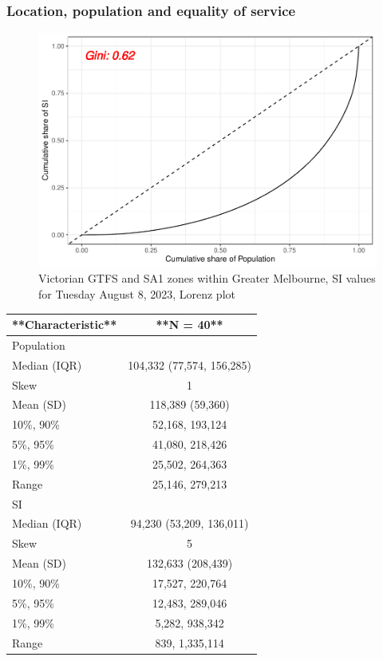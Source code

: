 \documentclass[preprint, 3p,
authoryear]{elsarticle} %
\begin{document}
\hypertarget{location-population-and-equality-of-service}{%
\subsubsection{Location, population and equality of
service}\label{location-population-and-equality-of-service}}

\begin{figure}
\centering
\includegraphics{Leveraging_GTFS_to_assess_transit_supply_Transport_Geography_files/figure-latex/Gini_coefficients-1.pdf}
\caption{Victorian GTFS and SA1 zones within Greater Melbourne, SI
values for Tuesday August 8, 2023, Lorenz plot}
\end{figure}

\begin{tabular}{l|c}
\hline
**Characteristic** & **N = 40**\\
\hline
Population & \\
\hline
Median (IQR) & 104,332 (77,574, 156,285)\\
\hline
Skew & 1\\
\hline
Mean (SD) & 118,389 (59,360)\\
\hline
10\%, 90\% & 52,168, 193,124\\
\hline
5\%, 95\% & 41,080, 218,426\\
\hline
1\%, 99\% & 25,502, 264,363\\
\hline
Range & 25,146, 279,213\\
\hline
SI & \\
\hline
Median (IQR) & 94,230 (53,209, 136,011)\\
\hline
Skew & 5\\
\hline
Mean (SD) & 132,633 (208,439)\\
\hline
10\%, 90\% & 17,527, 220,764\\
\hline
5\%, 95\% & 12,483, 289,046\\
\hline
1\%, 99\% & 5,282, 938,342\\
\hline
Range & 839, 1,335,114\\
\hline
\end{tabular}
\end{document}
